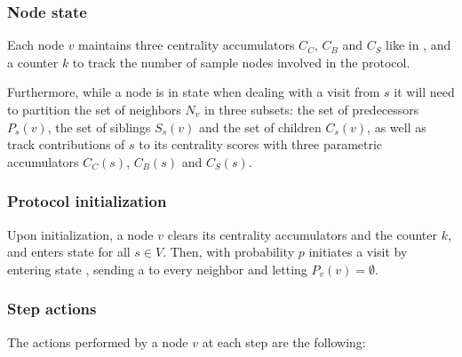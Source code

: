 \subsubsection{Node state}
Each node $v$ maintains three centrality accumulators $C_C$, $C_B$ and $C_S$ like in \deccen{}, and a counter $k$ to track the number of sample nodes involved in the protocol.

Furthermore, while a node is in state  when dealing with a visit from $s$ it will need to partition the set of neighbors $N_v$ in three subsets: the set of predecessors $P_s(v)$, the set of siblings $S_s(v)$ and the set of children $C_s(v)$, as well as track contributions of $s$ to its centrality scores with three parametric accumulators $C_C(s)$, $C_B(s)$ and $C_S(s)$.

\subsubsection{Protocol initialization}
Upon initialization, a node $v$ clears its centrality accumulators and the counter $k$, and enters state  for all $s \in V$. Then, with probability $p$ initiates a visit by entering state , sending a  to every neighbor and letting $P_v(v) = \emptyset$.

\subsubsection{Step actions}
\label{multibfs:step}
The actions performed by a node $v$ at each step are the following:

